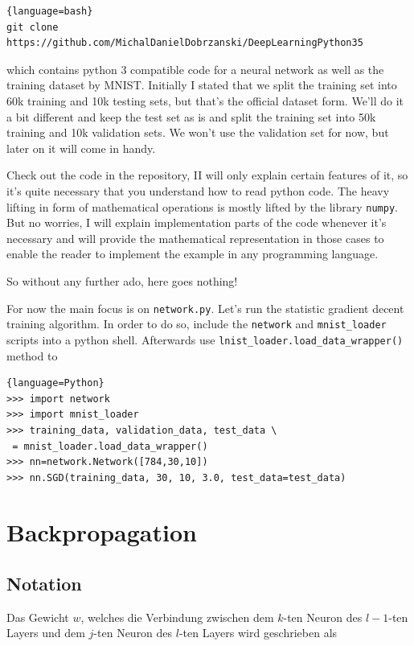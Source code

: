 \documentclass[10pt]{book}
\begin{document}
    \begin{lstlisting}[basicstyle=\tiny]{language=bash}
git clone https://github.com/MichalDanielDobrzanski/DeepLearningPython35
    \end{lstlisting}
    which contains python 3 compatible code for a neural network as well as the training dataset by MNIST.
    Initially I stated that we split the training set into 60k training and 10k testing sets, but that's the official
    dataset form. We'll do it a bit different and keep the test set as is and split the training set into 50k training and 10k
    validation sets. We won't use the validation set for now, but later on it will come in handy.

    Check out the code in the repository, II will only explain certain features of it, so it's quite necessary that you understand how to read python code.
    The heavy lifting in form of mathematical operations is mostly lifted by the library \lstinline{numpy}. But no worries, I will explain implementation parts of the code whenever it's necessary and
    will provide the mathematical representation in those cases to enable the reader to implement the example in any programming language.

    So without any further ado, here goes nothing!

    For now the main focus is on \lstinline{network.py}. Let's run the statistic gradient decent training algorithm.
    In order to do so, include the \lstinline{network} and \lstinline{mnist_loader} scripts into  a python shell.
    Afterwards use \lstinline{lnist_loader.load_data_wrapper()} method to 
\begin{lstlisting}{language=Python}
>>> import network
>>> import mnist_loader
>>> training_data, validation_data, test_data \
 = mnist_loader.load_data_wrapper()
>>> nn=network.Network([784,30,10])
>>> nn.SGD(training_data, 30, 10, 3.0, test_data=test_data)
\end{lstlisting}
    
    \section{Backpropagation}
    \subsection{Notation}

    Das Gewicht \(w\), welches die Verbindung zwischen dem \(k\)-ten Neuron des \(l-1\)-ten Layers und dem \(j\)-ten Neuron des \(l\)-ten Layers
    wird geschrieben als
\end{document}
